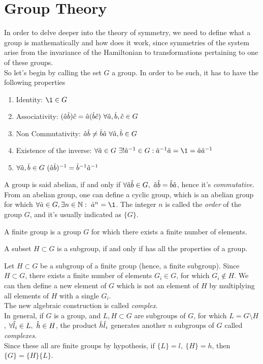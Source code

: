 \documentclass[../qm.tex]{subfiles}
\begin{document}
	\section{Group Theory}
	In order to delve deeper into the theory of symmetry, we need to define what a group is mathematically and how does it work, since symmetries of the system arise from the invariance of the Hamiltonian to transformations pertaining to one of these groups.\\
	So let's begin by calling the set $G$ a group. In order to be such, it has to have the following properties
	\begin{enumerate}
	\item Identity: $\1\in G$
	\item Associativity: $(\opr{a}\opr{b})\opr{c}=\opr{a}(\opr{b}\opr{c})\ \forall\opr{a},\opr{b},\opr{c}\in G$
	\item Non Commutativity: $\opr{a}\opr{b}\ne\opr{b}\opr{a}\ \forall\opr{a},\opr{b}\in G$
	\item Existence of the inverse: $\forall\opr{a}\in G\ \exists!\opr{a}^{-1}\in G:\opr{a}^{-1}\opr{a}=\1=\opr{a}\opr{a}^{-1}$
	\item $\forall\opr{a},\opr{b}\in G\ (\opr{a}\opr{b})^{-1}=\opr{b}^{-1}\opr{a}^{-1}$
	\end{enumerate}
	A group is said abelian, if and only if $\forall\opr{a}\opr{b}\in G,\ \opr{a}\opr{b}=\opr{b}\opr{a}$, hence it's \textit{commutative}.\\
	From an abelian group, one can define a cyclic group, which is an abelian group for which $\forall\opr{a}\in G,\exists n\in\N:\ \opr{a}^n=\1$. The integer $n$ is called the \textit{order} of the group $G$, and it's usually indicated as $\{G\}$.\\
	\begin{defn}
		A finite group is a group $G$ for which there exists a finite number of elements.
	\end{defn}
	\begin{defn}[Subgroup]
		A subset $H\subset G$ is a subgroup, if and only if has all the properties of a group.
	\end{defn}
	\begin{defn}[Complex]
		Let $H\subset G$ be a subgroup of a finite group (hence, a finite subgroup). Since $H\subset G$, there exists a finite number of elements $G_i\in G$, for which $G_i\notin H$. We can then define a new element of $G$ which is not an element of $H$ by multiplying all elements of $H$ with a single $G_i$.\\
		The new algebraic construction is called \textit{complex}.\\
		In general, if $G$ is a group, and $L,H\subset G$ are subgroups of $G$, for which $L=G\setminus H$, $\forall \hat{l}_i\in L,\ \hat{h}\in H$, the product $\hat{h}\hat{l}_i$ generates another $n$ subgroups of $G$ called \textit{complexes}.\\
		Since these all are finite groups by hypothesis, if $\{L\}=l,\ \{H\}=h$, then $\{G\}=\{H\}\{L\}$.
	\end{defn}
\end{document}

